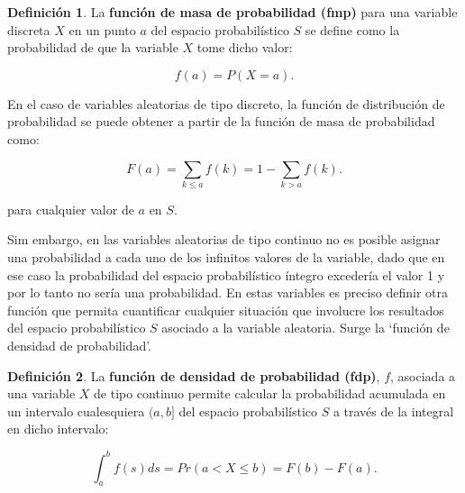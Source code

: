 \documentclass[
]{book}
\newenvironment{yellowbox}{
  \definecolor{shadecolor}{rgb}{210, 180, 140}  
  \color{black}
  \begin{shaded}}
 {\end{shaded}}
\theoremstyle{definition}
\newtheorem{definition}{Definición}[chapter]
\theoremstyle{definition}
\theoremstyle{definition}
\theoremstyle{definition}
\theoremstyle{remark}
\begin{document}
\begin{yellowbox}

\begin{definition}
\protect\hypertarget{def:fmp}{}\label{def:fmp}La \textbf{función de masa de probabilidad (fmp)} para una variable discreta \(X\) en un punto \(a\) del espacio probabilístico \(S\) se define como la probabilidad de que la variable \(X\) tome dicho valor:

\begin{equation*}
  f(a) = P(X = a).
\end{equation*}
\end{definition}

\end{yellowbox}

En el caso de variables aleatorias de tipo discreto, la función de distribución de probabilidad se puede obtener a partir de la función de masa de probabilidad como:

\begin{equation*}
  F(a) = \sum_{k \leq a} f(k) = 1 - \sum_{k > a} f(k).
\end{equation*}

para cualquier valor de \(a\) en \(S\).

Sim embargo, en las variables aleatorias de tipo continuo no es posible asignar una probabilidad a cada uno de los infinitos valores de la variable, dado que en ese caso la probabilidad del espacio probabilístico íntegro excedería el valor 1 y por lo tanto no sería una probabilidad. En estas variables es preciso definir otra función que permita cuantificar cualquier situación que involucre los resultados del espacio probabilístico \(S\) asociado a la variable aleatoria. Surge la `función de densidad de probabilidad'.

\begin{yellowbox}

\begin{definition}
\protect\hypertarget{def:fdp}{}\label{def:fdp}La \textbf{función de densidad de probabilidad (fdp)}, \(f\), asociada a una variable \(X\) de tipo continuo permite calcular la probabilidad acumulada en un intervalo cualesquiera \((a,b]\) del espacio probabilístico \(S\) a través de la integral en dicho intervalo:

\begin{equation*}
  \int_{a}^{b} f(s)ds = Pr(a < X \leq b) = F(b) - F(a).
\end{equation*}
\end{definition}

\end{yellowbox}
\end{document}

